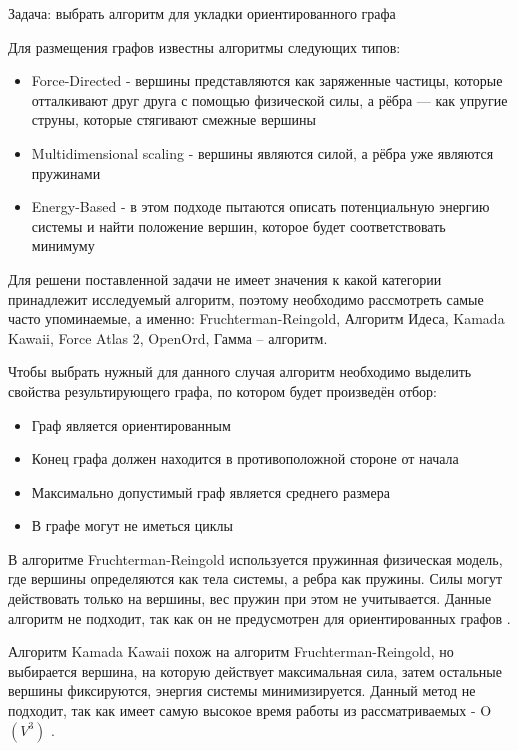 \def\notedate{2022.11.21}
\def\currentauthor{Журавлев Н.В. (РК6-72Б)}
Задача: выбрать алгоритм для укладки ориентированного графа

Для размещения графов известны алгоритмы следующих типов\cite{alg-graph}:
\begin{itemize}
\item Force-Directed - вершины представляются как заряженные частицы, которые отталкивают друг друга с помощью физической силы, а рёбра — как упругие струны, которые стягивают смежные вершины
\item Multidimensional scaling - вершины являются силой, а рёбра уже являются пружинами
\item Energy-Based - в этом подходе пытаются описать потенциальную энергию системы и найти положение вершин, которое будет соответствовать минимуму
\end{itemize}

Для решени поставленной задачи не имеет значения к какой категории принадлежит исследуемый алгоритм, поэтому необходимо рассмотреть самые часто упоминаемые, а именно: Fruchterman-Reingold, Алгоритм Идеса, Kamada Kawaii, Force Atlas 2, OpenOrd, Гамма – алгоритм.

Чтобы выбрать нужный для данного случая алгоритм необходимо выделить свойства результирующего графа, по котором будет произведён отбор:
\begin{itemize}
\item Граф является ориентированным
\item Конец графа должен находится в противоположной стороне от начала
\item Максимально допустимый граф является среднего размера
\item В графе могут не иметься циклы
\end{itemize}

В алгоритме Fruchterman-Reingold используется пружинная физическая модель, где вершины определяются как тела системы, а ребра как пружины. Силы могут действовать только на вершины, вес пружин при этом не учитывается. Данные алгоритм не подходит, так как он не предусмотрен для ориентированных графов \cite{alg-fruchterman}.

Алгоритм Kamada Kawaii похож на алгоритм Fruchterman-Reingold, но выбирается вершина, на которую действует максимальная сила, затем остальные вершины фиксируются, энергия системы минимизируется. Данный метод не подходит, так как имеет самую высокое время работы из рассматриваемых - O$(V^3)$ \cite{alg-kamada-kawai}.

